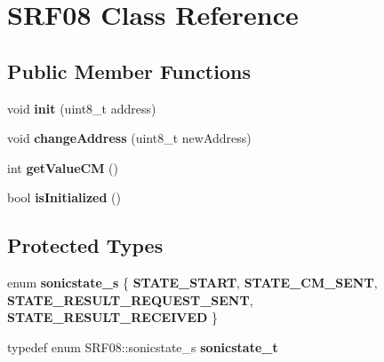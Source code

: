 \hypertarget{class_s_r_f08}{}\section{S\+R\+F08 Class Reference}
\label{class_s_r_f08}
\subsection*{Public Member Functions}
\begin{DoxyCompactItemize}
\item 
void {\bfseries init} (uint8\+\_\+t address)\hypertarget{class_s_r_f08_a2f2920aeafb6916589c1a9a7f2443dc6}{}\label{class_s_r_f08_a2f2920aeafb6916589c1a9a7f2443dc6}

\item 
void {\bfseries change\+Address} (uint8\+\_\+t new\+Address)\hypertarget{class_s_r_f08_a3b94c05d2c9aa0bbdde496f637875a4c}{}\label{class_s_r_f08_a3b94c05d2c9aa0bbdde496f637875a4c}

\item 
int {\bfseries get\+Value\+CM} ()\hypertarget{class_s_r_f08_abe78d5649f8bade345a5e42cd6bc84ce}{}\label{class_s_r_f08_abe78d5649f8bade345a5e42cd6bc84ce}

\item 
bool {\bfseries is\+Initialized} ()\hypertarget{class_s_r_f08_a0e0d9a2064498f8c5c862c1c8f0c35f6}{}\label{class_s_r_f08_a0e0d9a2064498f8c5c862c1c8f0c35f6}

\end{DoxyCompactItemize}
\subsection*{Protected Types}
\begin{DoxyCompactItemize}
\item 
enum {\bfseries sonicstate\+\_\+s} \{ {\bfseries S\+T\+A\+T\+E\+\_\+\+S\+T\+A\+RT}, 
{\bfseries S\+T\+A\+T\+E\+\_\+\+C\+M\+\_\+\+S\+E\+NT}, 
{\bfseries S\+T\+A\+T\+E\+\_\+\+R\+E\+S\+U\+L\+T\+\_\+\+R\+E\+Q\+U\+E\+S\+T\+\_\+\+S\+E\+NT}, 
{\bfseries S\+T\+A\+T\+E\+\_\+\+R\+E\+S\+U\+L\+T\+\_\+\+R\+E\+C\+E\+I\+V\+ED}
 \}\hypertarget{class_s_r_f08_ae6342593f4cbbabb7d31e4b0ba4051ce}{}\label{class_s_r_f08_ae6342593f4cbbabb7d31e4b0ba4051ce}

\item 
typedef enum S\+R\+F08\+::sonicstate\+\_\+s {\bfseries sonicstate\+\_\+t}\hypertarget{class_s_r_f08_a9de77ac90d87a1bc48f36e6aa961ebc0}{}\label{class_s_r_f08_a9de77ac90d87a1bc48f36e6aa961ebc0}

\end{DoxyCompactItemize}
